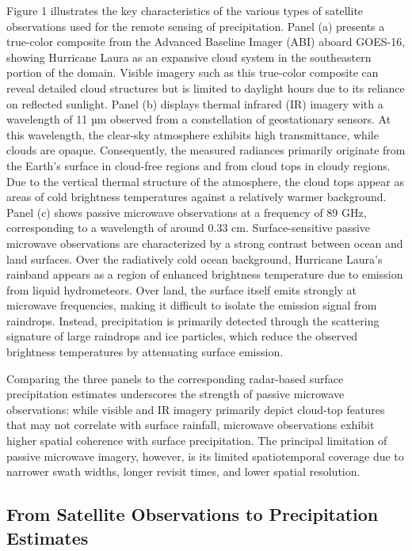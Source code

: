 \documentclass[11pt]{article}
\begin{document}
Figure 1 illustrates the key characteristics of the various types of satellite
observations used for the remote sensing of precipitation. Panel (a) presents a
true-color composite from the Advanced Baseline Imager (ABI) aboard GOES-16,
showing Hurricane Laura as an expansive cloud system in the southeastern portion
of the domain. Visible imagery such as this true-color composite can reveal
detailed cloud structures but is limited to daylight hours due to its reliance
on reflected sunlight. Panel (b) displays thermal infrared (IR) imagery with a
wavelength of 11 µm observed from a constellation of geostationary sensors. At
this wavelength, the clear-sky atmosphere exhibits high transmittance, while
clouds are opaque. Consequently, the measured radiances primarily originate from
the Earth’s surface in cloud-free regions and from cloud tops in cloudy regions.
Due to the vertical thermal structure of the atmosphere, the cloud tops appear
as areas of cold brightness temperatures against a relatively warmer background.
Panel (c) shows passive microwave observations at a frequency of 89 GHz,
corresponding to a wavelength of around 0.33 cm. Surface-sensitive passive
microwave observations are characterized by a strong contrast between ocean and
land surfaces. Over the radiatively cold ocean background, Hurricane Laura’s
rainband appears as a region of enhanced brightness temperature due to emission
from liquid hydrometeors. Over land, the surface itself emits strongly at
microwave frequencies, making it difficult to isolate the emission signal from
raindrops. Instead, precipitation is primarily detected through the scattering
signature of large raindrops and ice particles, which reduce the observed
brightness temperatures by attenuating surface emission.

Comparing the three panels to the corresponding radar-based surface
precipitation estimates underscores the strength of passive microwave
observations: while visible and IR imagery primarily depict cloud-top features
that may not correlate with surface rainfall, microwave observations exhibit
higher spatial coherence with surface precipitation. The principal limitation of
passive microwave imagery, however, is its limited spatiotemporal coverage due
to narrower swath widths, longer revisit times, and lower spatial resolution.

\subsection{From Satellite Observations to Precipitation Estimates}
\end{document}
